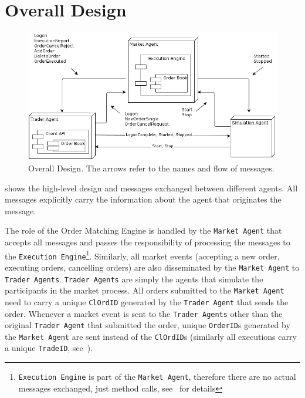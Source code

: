 \section{Overall Design}
\label{Chapters/Analysis-and-Design/Overall-Design}

\begin{figure}[h]
\centerline{\includegraphics[scale=0.6]{Chapters/Analysis-and-Design/Design.png}}
\caption{Overall Design. The arrows refer to the names and flow of messages.}
\label{Figures/Analysis-and-Design/Design}
\end{figure}

 shows the high-level design and messages exchanged between different agents. All messages explicitly carry the information about the agent that originates the message. 

The role of the Order Matching Engine is handled by the \texttt{Market Agent} that accepts all messages and passes the responsibility of processing the messages to the \texttt{Execution Engine}\footnote{\texttt{Execution Engine} is part of the \texttt{Market Agent}, therefore there are no actual messages exchanged, just method calls, see~ for details}. Similarly, all market events (accepting a new order, executing orders, cancelling orders) are also disseminated by the \texttt{Market Agent} to \texttt{Trader Agents}. \texttt{Trader Agents} are simply the agents that simulate the participants in the market process. All orders submitted to the \texttt{Market Agent} need to carry a unique \texttt{ClOrdID} generated by the \texttt{Trader Agent} that sends the order. Whenever a market event is sent to the \texttt{Trader Agents} other than the original \texttt{Trader Agent} that submitted the order, unique \texttt{OrderID}s generated by the \texttt{Market Agent} are sent instead of the \texttt{ClOrdID}s (similarly all executions carry a unique \texttt{TradeID}, see~).

